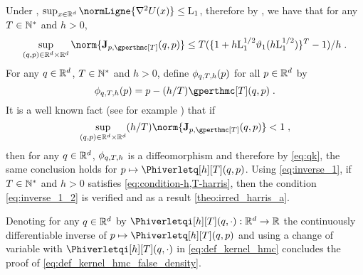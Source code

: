 Under , $\sup_{x \in \rset^d} \normLigne{\nabla^2 \F(x)}
 \leq \constzero$, therefore by , we have that for any $T \in \mathbb{N}^{*}$ and $h >0$,
\begin{equation}
  \label{eq:inverse_1}
 \sup_{(\q,\p) \in \rset^d \times \rset^d} \norm{\Jac_{p,\gperthmc[T]}(q,p)}
 \leq  T (\{1 + h \constzero^{1/2} \vartheta_1(h \constzero^{1/2})\}^T  -1) /h  \eqsp.
\end{equation}
For any $q \in \mathbb{R}^d$, $T\in \mathbb{N}^{*}$ and $h >0$, define $\phi_{q,T,h}(p)$  for all  $p \in \mathbb{R}^d$ by
\begin{equation}
  \phia_{q,T,h} (p) = p-(h/T) \gperthmc[T](q,p) \eqsp.
\end{equation}
It is a well known fact (see for example
\cite[Exercise 3.26]{duistermaat:kolk:2004}) that if
\begin{equation}
  \label{eq:inverse_1_2}
  \sup_{(q,p) \in \rset^d \times \rset^d} (h/T)\norm{ \Jac_{p,\gperthmc[T]}(q,p)} < 1 \eqsp,
\end{equation}
then for any $q \in \mathbb{R}^d$, $\phi_{q,T,h}$ is a
diffeomorphism and  therefore by \eqref{eq:qk}, the same conclusion holds
for $p \mapsto \Phiverletq[h][T](q,p)$. Using \eqref{eq:inverse_1}, if $T \in \mathbb{N}^{*}$ and $h > 0$  satisfies \eqref{eq:condition-h,T-harris},
then the condition \eqref{eq:inverse_1_2} is verified and as a result \eqref{theo:irred_harris_a}.

Denoting for any $q \in \mathbb{R}^d$ by $\Phiverletqi[h][T](q,\cdot) : \rset^d \to \rset$ the
continuously differentiable inverse of $p \mapsto
\Phiverletq[h][T](q,p)$ and using a change of variable with $\Phiverletqi[h][T](q,\cdot)$ in \eqref{eq:def_kernel_hmc} concludes the proof of \eqref{eq:def_kernel_hmc_false_density}.

